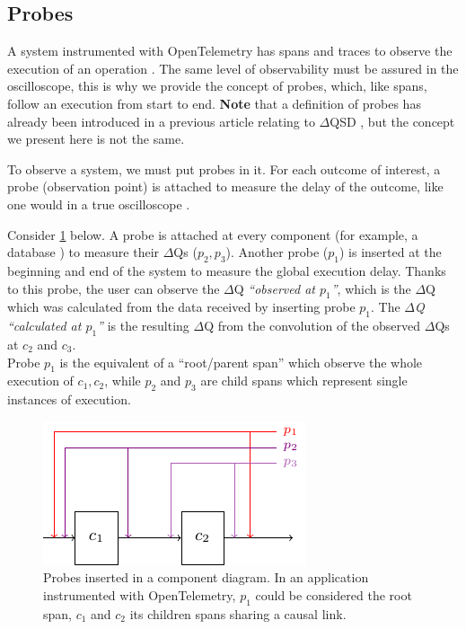 \subsection{Probes}

A system instrumented with OpenTelemetry has spans and traces to observe the execution of an operation \cite{otel-t}. The same level of observability must be assured in the oscilloscope, this is why we provide the concept of probes, which, like spans, follow an execution from start to end. \textbf{Note} that a definition of probes has already been introduced in a previous article relating to $\Delta$QSD \cite{dq-br}, but the concept we present here is not the same.

To observe a system, we must put probes in it. For each outcome of interest, a probe (observation point) is attached to measure the delay of the outcome, like one would in a true oscilloscope \cite{post}.

Consider \cref{fig:probes} below. A probe is attached at every component (for example, a database \cite{dq-tut}) to measure their $\Delta$Qs ($p_2, p_3$). Another probe ($p_1$) is inserted at the beginning and end of the system to measure the global execution delay. Thanks to this probe, the user can observe the $\Delta$Q \textit{``observed at $p_1$''}, which is the $\Delta$Q which was calculated from the data received by inserting probe $p_1$. The \textit{$\Delta$Q ``calculated at $p_1$''} is the resulting $\Delta$Q from the convolution of the observed $\Delta$Qs at $c_2$ and $c_3$. \\
Probe $p_1$ is the equivalent of a ``root/parent span'' which observe the whole execution of $c_1, c_2$, while $p_2$ and $p_3$ are child spans which represent single instances of execution.

    \begin{figure}[H]
        \begin{center}
            \includegraphics[scale=1.8]{tikz/probes.pdf}
        \end{center}
        \caption{Probes inserted in a component diagram. In an application instrumented with OpenTelemetry, $p_1$ could be considered the root span, $c_1$ and $c_2$ its children spans sharing a causal link.}
        \label{fig:probes}
    \end{figure}



